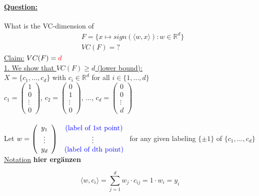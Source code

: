 \documentclass[10pt,a4paper]{article}
\theoremstyle{definition}
\theoremstyle{plain}
\begin{document}
\paragraph{\underline{Question:}} What is the VC-dimension of
\begin{align*}
	&F =  \{ x \mapsto sign(\langle w,x \rangle): w \in \mathbb{R}^d \}\\
	&VC(F) = ?
\end{align*}
\underline{Claim:} $VC(F) = \textcolor{red}{d}$\\

\underline{1. We show that $VC(F)\geq d$ (lower bound):}\\
	$X = \{ c_1, ..., c_d \}$ with $c_i \in \mathbb{R}^d$ for all $i \in \{ 1, ..., d \}$\\
	$c_1 = \left(\begin{array}{c} 1 \\ 0 \\ \vdots \\ 0 \end{array}\right)$,
	$c_2 = \left(\begin{array}{c} 0 \\ 1 \\ \vdots \\ 0 \end{array}\right)$,
	$\hdots$, 
	$c_d = \left(\begin{array}{c} 0 \\ 0 \\ \vdots \\ d \end{array}\right)$\\
	\\
	Let 
	$w = \left(\begin{array}{c} 
		y_1 \\
		 \vdots \\
		 y_d \end{array}\right)
		 \begin{array}{c} 
		 	\textcolor{blue}{\text{ (label of 1st point)}}  \\
		 	\vdots \\
		 	\textcolor{blue}{\text{ (label of dth point)}}  
		 \end{array}$ 
	for any given labeling $\{ \pm 1 \}$ of $\{ c_1, ..., c_d \}$\\
	
	\underline{Notation} \textbf{hier ergänzen}
	
	$$
		\langle w, c_i \rangle = \sum_{j=1}^{d} w_j \cdot c_{ij} = 1 \cdot w_i = y_i 
	$$
	
\end{document}
